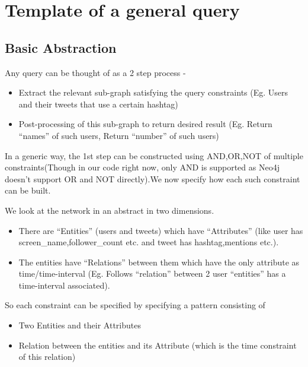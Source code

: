 \documentclass[letterpaper,10pt,english]{sphinxmanual}
\begin{document}
\section{Template of a general query}
\label{\detokenize{neo4j_query_generation:template-of-a-general-query}}

\subsection{Basic Abstraction}
\label{\detokenize{neo4j_query_generation:basic-abstraction}}
Any query can be thought of as a 2 step process -
\begin{itemize}
\item {} 
Extract the relevant sub-graph satisfying the query constraints (Eg. Users and their tweets that use a certain hashtag)

\item {} 
Post-processing of this sub-graph to return desired result (Eg. Return “names” of such users, Return “number” of such users)

\end{itemize}

In a generic way, the 1st step can be constructed using AND,OR,NOT of multiple constraints(Though in our code right now, only AND is supported as Neo4j doesn’t support OR and NOT directly).We now specify how each such constraint can be built.

We look at the network in an abstract in two dimensions.
\begin{itemize}
\item {} 
There are “Entities” (users and tweets) which have “Attributes” (like user has screen\_name,follower\_count etc. and tweet has hashtag,mentions etc.).

\item {} 
The entities have “Relations” between them which have the only attribute as time/time-interval (Eg. Follows “relation” between 2 user “entities” has a time-interval associated).

\end{itemize}

So each constraint can be specified by specifying a pattern consisting of
\begin{itemize}
\item {} 
Two Entities and their Attributes

\item {} 
Relation between the entities and its Attribute (which is the time constraint of this relation)

\end{itemize}
\end{document}
